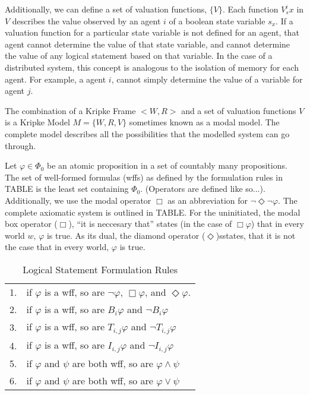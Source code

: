 Additionally, we can define a set of valuation functions, $\{V\}$. Each function $V^i_sx$ in $V$ describes the value observed by an agent $i$ of a boolean state variable $s_x$.  If a valuation function for a particular state variable is not defined for an agent, that agent cannot determine the value of that state variable, and cannot determine the value of any logical statement based on that variable. In the case of a distributed system, this concept is analogous to the isolation of memory for each agent. For example, a agent $i$, cannot simply determine the value of a variable for agent $j$.

The combination of a Kripke Frame $< W,R >$ and a set of valuation functions ${V}$ is a Kripke Model $M = \{W, R, V\}$ sometimes known as a modal model. The complete model describes all the possibilities that the modelled system can go through.

Let $\varphi \in \Phi_0$ be an atomic proposition in a set of countably many propositions. The set of well-formed formulas (wffs) as defined by the formulation rules in TABLE is the least set containing $\Phi_0$. (Operators are defined like so...). Additionally, we use the modal operator $\Box$ as an abbreviation for $\neg \Diamond \neg \varphi$. The complete axiomatic system is outlined in TABLE. For the uninitiated, the modal box operator ($\Box$), ``it is neccesary that'' states (in the case of $\Box \varphi$) that in every world $w$, $\varphi$ is true. As its dual, the diamond operator ($\Diamond$)sstates, that it is not the case that in every world, $\varphi$ is true.

\begin{table}[]
\centering
\begin{tabular}{r l}
1. & if $\varphi$ is a wff, so are $\neg \varphi$, $\Box \varphi$, and $\Diamond \varphi$. \\
2. & if $\varphi$ is a wff, so are $B_i \varphi$ and $\neg B_i \varphi$ \\
3. & if $\varphi$ is a wff, so are $T_{i,j} \varphi$ and $\neg T_{i,j} \varphi$ \\
4. & if $\varphi$ is a wff, so are $I_{i,j} \varphi$ and $\neg I_{i,j} \varphi$ \\
5. & if $\varphi$ and $\psi$ are both wff, so are $\varphi \wedge \psi$ \\
6. & if $\varphi$ and $\psi$ are both wff, so are $\varphi \vee \psi$ \\
\end{tabular}
\caption{Logical Statement Formulation Rules}
\label{tab:logform}
\end{table}

